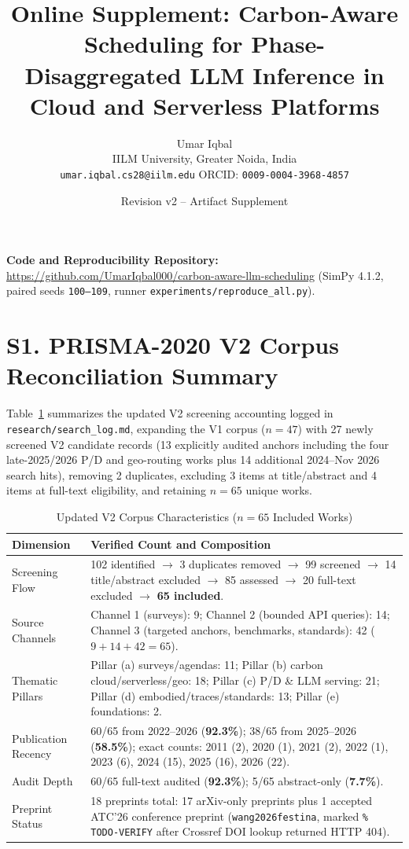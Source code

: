 \documentclass[11pt,a4paper]{article}
\title{\textbf{Online Supplement: Carbon-Aware Scheduling for Phase-Disaggregated LLM Inference in Cloud and Serverless Platforms}}
\author{Umar Iqbal \\ IILM University, Greater Noida, India \\ \texttt{umar.iqbal.cs28@iilm.edu} \quad ORCID: \texttt{0009-0004-3968-4857}}
\date{Revision v2 -- Artifact Supplement}
\begin{document}
\maketitle

\noindent\textbf{Code and Reproducibility Repository:} \url{https://github.com/UmarIqbal000/carbon-aware-llm-scheduling} (SimPy 4.1.2, paired seeds \texttt{100--109}, runner \texttt{experiments/reproduce\_all.py}).

\section*{S1. PRISMA-2020 V2 Corpus Reconciliation Summary}
Table~\ref{tab:supp_prisma} summarizes the updated V2 screening accounting logged in \texttt{research/search\_log.md}, expanding the V1 corpus ($n=47$) with 27 newly screened V2 candidate records (13 explicitly audited anchors including the four late-2025/2026 P/D and geo-routing works plus 14 additional 2024--Nov 2026 search hits), removing 2 duplicates, excluding 3 items at title/abstract and 4 items at full-text eligibility, and retaining $n=65$ unique works.

\begin{table}[ht]
\centering
\caption{Updated V2 Corpus Characteristics ($n=65$ Included Works)}
\label{tab:supp_prisma}
\begin{tabularx}{\textwidth}{l X}
\toprule
\textbf{Dimension} & \textbf{Verified Count and Composition} \\
\midrule
Screening Flow & 102 identified $\to$ 3 duplicates removed $\to$ 99 screened $\to$ 14 title/abstract excluded $\to$ 85 assessed $\to$ 20 full-text excluded $\to$ \textbf{65 included}. \\
Source Channels & Channel 1 (surveys): 9; Channel 2 (bounded API queries): 14; Channel 3 (targeted anchors, benchmarks, standards): 42 ($9+14+42=65$). \\
Thematic Pillars & Pillar (a) surveys/agendas: 11; Pillar (b) carbon cloud/serverless/geo: 18; Pillar (c) P/D \& LLM serving: 21; Pillar (d) embodied/traces/standards: 13; Pillar (e) foundations: 2. \\
Publication Recency & 60/65 from 2022--2026 (\textbf{92.3\%}); 38/65 from 2025--2026 (\textbf{58.5\%}); exact counts: 2011 (2), 2020 (1), 2021 (2), 2022 (1), 2023 (6), 2024 (15), 2025 (16), 2026 (22). \\
Audit Depth & 60/65 full-text audited (\textbf{92.3\%}); 5/65 abstract-only (\textbf{7.7\%}). \\
Preprint Status & 18 preprints total: 17 arXiv-only preprints plus 1 accepted ATC'26 conference preprint (\texttt{wang2026festina}, marked \texttt{\% TODO-VERIFY} after Crossref DOI lookup returned HTTP 404). \\
\bottomrule
\end{tabularx}
\end{table}
\end{document}
